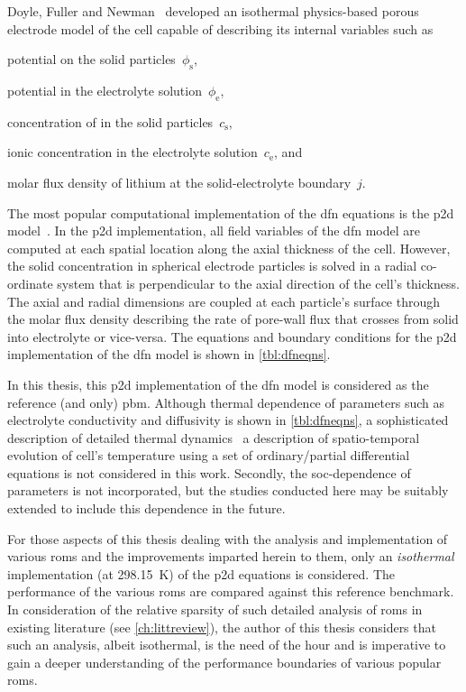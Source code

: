 Doyle,  Fuller and  Newman~\cite{Doyle1993,Fuller1994}  developed an  isothermal
physics-based  porous electrode  model of  the  cell capable  of describing  its
internal variables such as
\begin{enumerate*}[label=\itshape\alph*\upshape)]
    \item potential on the solid particles~$\phi_\text{s}$,
    \item potential in the electrolyte solution~$\phi_\text{e}$,
    \item concentration of  in the solid particles~$c_\text{s}$,
    \item ionic concentration in the electrolyte solution~$c_\text{e}$, and
    \item molar flux density of lithium at the solid-electrolyte boundary~$j$.
\end{enumerate*}
The most popular computational implementation  of the \gls{dfn} equations is the
\gls{p2d}  model~\cite{Plett2015}. In  the \gls{p2d}  implementation, all  field
variables  of  the  \gls{dfn}  model  are  computed  at  each  spatial  location
along  the axial  thickness of  the cell.  However, the  solid concentration  in
spherical electrode particles  is solved in a radial co-ordinate  system that is
perpendicular to  the axial  direction of  the cell's  thickness. The  axial and
radial dimensions are coupled at each  particle's surface through the molar flux
density  describing the  rate of  pore-wall flux  that crosses  from solid  into
electrolyte  or  vice-versa.  The  equations and  boundary  conditions  for  the
\gls{p2d} implementation of the \gls{dfn} model is shown in \cref{tbl:dfneqns}.



In  this  thesis,  this  \gls{p2d}  implementation of  the  \gls{dfn}  model  is
considered as  the reference (and  only) \gls{pbm}. Although  thermal dependence
of  parameters  such  as  electrolyte  conductivity  and  diffusivity  is  shown
in \cref{tbl:dfneqns}, a sophisticated description  of detailed thermal dynamics
\ie~a description  of spatio-temporal evolution of cell's  temperature using a
set of ordinary/partial  differential equations is not considered  in this work.
Secondly, the \gls{soc}-dependence of parameters is not incorporated, but the
studies conducted here may be suitably extended to include this dependence in
the future.

For those aspects of this thesis dealing with the analysis and implementation of
various  \glspl{rom} and  the  improvements  imparted herein  to  them, only  an
\emph{isothermal}  implementation  (at  \SI{298.15}{\kelvin}) of  the  \gls{p2d}
equations  is  considered.  The  performance  of  the  various  \glspl{rom}  are
compared  against this  reference benchmark.  In consideration  of the  relative
sparsity of  such detailed analysis  of \glspl{rom} in existing  literature (see
\cref{ch:littreview}),  the  author  of  this  thesis  considers  that  such  an
analysis, albeit isothermal, is  the need of the hour and  is imperative to gain
a  deeper  understanding  of  the  performance  boundaries  of  various  popular
\glspl{rom}.

